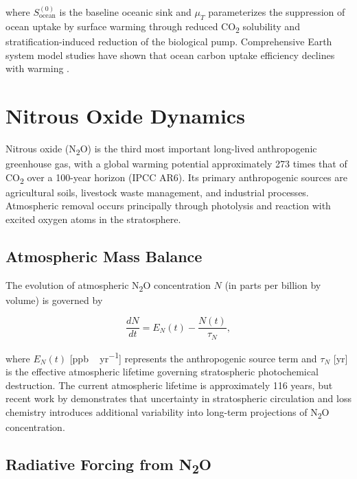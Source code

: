 \documentclass[12pt]{article}
\newcommand{\ddt}[1]{\frac{d#1}{dt}}
\begin{document}
where $S_{\mathrm{ocean}}^{(0)}$ is the baseline oceanic sink and $\mu_T$
parameterizes the suppression of ocean uptake by surface warming through reduced
CO\textsubscript{2} solubility and stratification-induced reduction of the
biological pump.  Comprehensive Earth system model studies have shown that
ocean carbon uptake efficiency declines with warming \citep{Friedlingstein2014}.

\section{Nitrous Oxide Dynamics}
\label{sec:n2o}

Nitrous oxide (N\textsubscript{2}O) is the third most important long-lived
anthropogenic greenhouse gas, with a global warming potential approximately
273 times that of CO\textsubscript{2} over a 100-year horizon (IPCC AR6).  Its
primary anthropogenic sources are agricultural soils, livestock waste management,
and industrial processes.  Atmospheric removal occurs principally through
photolysis and reaction with excited oxygen atoms in the stratosphere.

\subsection{Atmospheric Mass Balance}

The evolution of atmospheric N\textsubscript{2}O concentration $N$ (in parts
per billion by volume) is governed by

\begin{equation}
  \ddt{N} = E_N(t) - \frac{N(t)}{\tau_N},
  \label{eq:N2O}
\end{equation}

where $E_N(t)$ [\si{ppb\,yr^{-1}}] represents the anthropogenic source term and
$\tau_N$ [\si{yr}] is the effective atmospheric lifetime governing stratospheric
photochemical destruction.  The current atmospheric lifetime is approximately
116 years, but recent work by \citet{Prather2026} demonstrates that uncertainty
in stratospheric circulation and loss chemistry introduces additional variability
into long-term projections of N\textsubscript{2}O concentration.

\subsection{Radiative Forcing from N\texorpdfstring{\textsubscript{2}O}{2O}}
\end{document}
